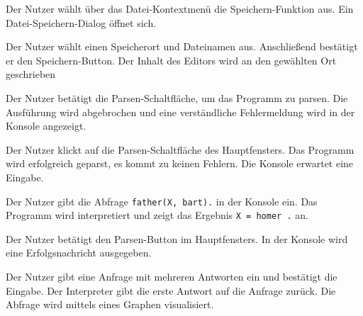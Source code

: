 \documentclass[parskip=full,11pt,twoside]{scrartcl}
\begin{document}


{Der Nutzer wählt über das Datei-Kontextmenü die Speichern-Funktion aus.}
{Ein Datei-Speichern-Dialog öffnet sich.}

{Der Nutzer wählt einen Speicherort und Dateinamen aus. Anschließend bestätigt er den Speichern-Button.}
{Der Inhalt des Editors wird an den gewählten Ort geschrieben}



{Der Nutzer betätigt die Parsen-Schaltfläche, um das Programm zu parsen.}
{Die Ausführung wird abgebrochen und eine verständliche Fehlermeldung wird in der Konsole angezeigt.}



{Der Nutzer klickt auf die Parsen-Schaltfläche des Hauptfensters.}
{Das Programm wird erfolgreich geparst, es kommt zu keinen Fehlern. Die Konsole erwartet eine Eingabe.}

{Der Nutzer gibt die Abfrage \texttt{father(X, bart).} in der Konsole ein.}
{Das Programm wird interpretiert und zeigt das Ergebnis \texttt{X = homer .} an.}



{Der Nutzer betätigt den Parsen-Button im Hauptfensters.}
{In der Konsole wird eine Erfolgsnachricht ausgegeben.}

{Der Nutzer gibt eine Anfrage mit mehreren Antworten ein und bestätigt die Eingabe.}
{Der Interpreter gibt die erste Antwort auf die Anfrage zurück. Die Abfrage wird mittels eines Graphen visualisiert.}
\end{document}
